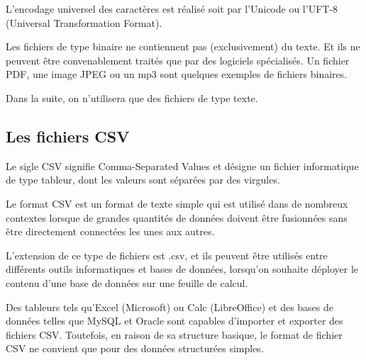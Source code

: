 L'encodage universel des caractères est réalisé soit par l'Unicode ou l'UFT-8 (Universal Transformation Format).

Les fichiers de type binaire ne contiennent pas (exclusivement) du texte. Et ils ne peuvent être convenablement traités que par des logiciels spécialisés. Un fichier PDF, une image JPEG ou un mp3 sont quelques exemples de fichiers binaires.

Dans la suite, on n'utilisera que des fichiers de type texte.

\subsection{Les fichiers CSV}

Le sigle CSV signifie Comma-Separated Values et désigne un fichier informatique de type tableur, dont les valeurs sont séparées par des virgules. 

Le format CSV est un format de texte simple qui est utilisé dans de nombreux contextes lorsque de grandes quantités de données doivent être fusionnées sans être directement connectées les unes aux autres.

L'extension de ce type de fichiers est .csv, et ils peuvent être utilisés entre différents outils informatiques et bases de données, lorsqu'on souhaite déployer le contenu d'une base de données sur une feuille de calcul.

Des tableurs tels qu'Excel (Microsoft) ou Calc (LibreOffice) et des bases de données telles que MySQL et Oracle sont capables d'importer et exporter des fichiers CSV. Toutefois, en raison de sa structure basique, le format de fichier CSV ne convient que pour des données structurées simples.

